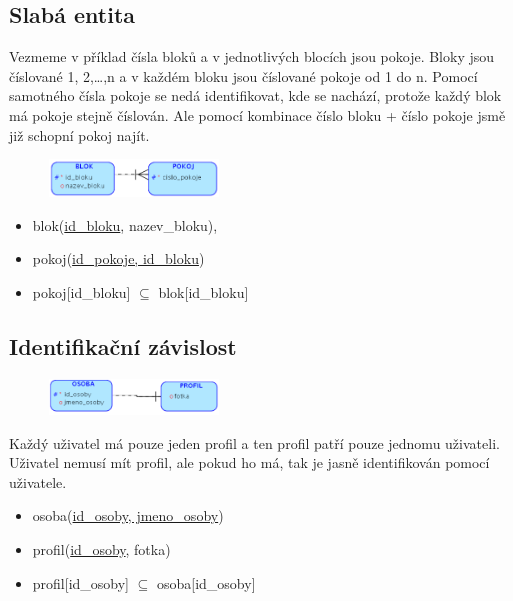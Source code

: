 \documentclass{szzclass}
\begin{document}
\subsection{Slabá entita}
Vezmeme v příklad čísla bloků a v jednotlivých blocích jsou pokoje. Bloky jsou číslované 1, 2,\dots,n a v každém bloku jsou číslované
pokoje od 1 do n. Pomocí samotného čísla pokoje se nedá identifikovat, kde se nachází, protože každý blok má pokoje stejně číslován.
Ale pomocí kombinace číslo bloku + číslo pokoje jsmě již schopní pokoj najít.
\begin{figure}[h!]
    \centering
    \includegraphics[width=0.4\textwidth]{topics/bi-wsi-si-02/images/weakEntity.png}
\end{figure}
\begin{itemize}
    \item blok(\underline{id\_bloku}, nazev\_bloku),
    \item pokoj(\underline{id\_pokoje, id\_bloku})
    \item pokoj[id\_bloku] $\subseteq$ blok[id\_bloku]
\end{itemize}

\subsection{Identifikační závislost}
\begin{figure}[h!]
    \centering
    \includegraphics[width=0.4\textwidth]{topics/bi-wsi-si-02/images/idenRelation.png}
\end{figure}
Každý uživatel má pouze jeden profil a ten profil patří pouze jednomu uživateli. Uživatel nemusí mít profil, ale pokud ho má, tak je jasně
identifikován pomocí uživatele.
\begin{itemize}
    \item osoba(\underline{id\_osoby, jmeno\_osoby})
    \item profil(\underline{id\_osoby}, fotka)
    \item profil[id\_osoby] $\subseteq$ osoba[id\_osoby]
\end{itemize}
\end{document}
